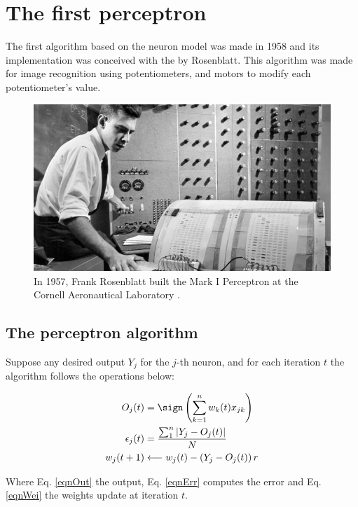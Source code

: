 \section{The first perceptron}

The first algorithm based on the neuron model was made in 1958 and its
implementation was conceived with the  by
Rosenblatt. This algorithm was made for image recognition using
potentiometers, and motors to modify each potentiometer's value.

\begin{figure}[!ht]
  \centering%
  \includegraphics[width=0.8\linewidth]{img/PerceptronRosenblatt}
  \caption{In 1957, Frank Rosenblatt built the Mark I Perceptron at the
  Cornell Aeronautical Laboratory \cite{PARULAMUSTREAD}.}
  \label{RosenPerceptronMKI}
\end{figure}

\subsection{The perceptron algorithm}

Suppose any desired output $Y_j$ for the $j$-th neuron, and for each
iteration $t$ the algorithm follows the operations below:

\begin{align}
  O_j(t) &= \sign\left(\sum^{n}_{k=1} w_k(t) x_{jk}\right)
  \label{eqnOut} \\
  \epsilon_j(t)  &= \frac{\sum_{1}^{n} \left| Y_j - O_j(t) \right|}{N}
  \label{eqnErr} \\
  w_j(t+1) &\longleftarrow w_j(t) - \left(Y_j - O_j(t)\right)r
  \label{eqnWei}
\end{align}

Where Eq. \ref{eqnOut} the output, Eq. \ref{eqnErr} computes the error and
Eq. \ref{eqnWei} the weights update at iteration $t$.

